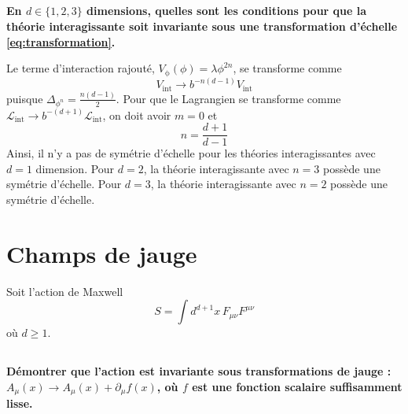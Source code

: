\documentclass{article}
\numberwithin{equation}{section}
\theoremstyle{solution}
\begin{document}
\subsection{}
\textbf{En $d \in \{1,2,3\}$ dimensions, quelles sont les conditions pour que la théorie interagissante soit invariante
sous une transformation d’échelle \eqref{eq:transformation}.}
\vspace{2ex}

Le terme d'interaction rajouté, $V_{\mathrm{\phi}}(\phi) = \lambda \phi^{2n}$, se transforme comme
\begin{equation}
        V_{\mathrm{int}} \rightarrow b^{-n(d-1)}V_{\mathrm{int}}
\end{equation} 
puisque $\Delta_{\phi^{n}} = \frac{n(d-1)}{2}$.
Pour que le Lagrangien se transforme comme $\mathcal{L}_{\mathrm{int}} \rightarrow b^{-(d+1)}\mathcal{L}_{\mathrm{int}}$, on doit avoir $m=0$ et 
\begin{equation}
        \boxed{n = \frac{d+1}{d-1}}
\end{equation} 
Ainsi, il n'y a pas de symétrie d'échelle pour les théories interagissantes avec $d=1$ dimension. 
Pour $d=2$, la théorie interagissante avec $n=3$ possède une symétrie d'échelle. Pour $d=3$, la théorie interagissante 
avec $n=2$ possède une symétrie d'échelle.

\section{Champs de jauge}
Soit l'action de Maxwell
\begin{equation}\label{eq:MaxwellAction}
       S = \int d^{d+1}x\, F_{\mu\nu}F^{\mu\nu}
\end{equation} 
où $d \geq 1$.
\subsection{}
\textbf{Démontrer que l’action est invariante sous transformations de jauge : $A_{\mu}(x) \rightarrow A_{\mu}(x) +
\partial_{\mu}f(x)$, où $f$ est une fonction scalaire suffisamment lisse.}
\vspace{2ex}
\end{document}
